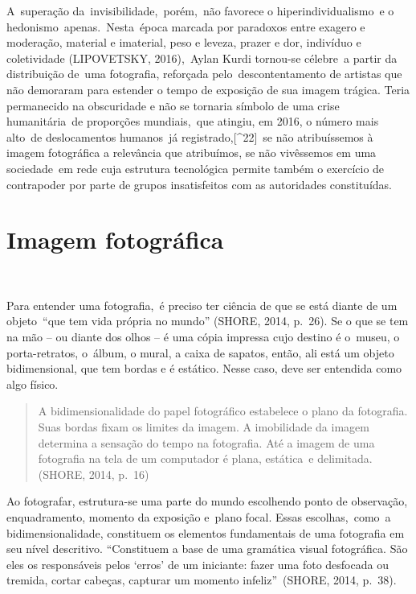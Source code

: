\documentclass[
  letterpaper,
]{scrbook}
\begin{document}
A~superação da~invisibilidade,~porém,~não favorece o
hiperindividualismo~e o hedonismo~apenas.~Nesta~época marcada por
paradoxos entre exagero e moderação, material e imaterial, peso e
leveza, prazer e dor, indivíduo e coletividade (LIPOVETSKY, 2016),~Aylan
Kurdi tornou-se célebre~a partir da distribuição de~uma fotografia,
reforçada pelo~descontentamento de artistas que não demoraram para
estender o tempo de exposição de sua imagem trágica. Teria permanecido
na obscuridade e não se tornaria símbolo de uma crise humanitária~de
proporções mundiais,~que atingiu, em 2016, o número mais alto~de
deslocamentos humanos~já registrado,{[}\^{}22{]}~se não atribuíssemos à
imagem fotográfica a relevância que atribuímos, se não vivêssemos em uma
sociedade~em rede cuja estrutura tecnológica permite também o exercício
de contrapoder por parte de grupos insatisfeitos com as autoridades
constituídas.~

\hypertarget{imagem-fotogruxe1fica}{%
\section{Imagem fotográfica~}\label{imagem-fotogruxe1fica}}

~

Para entender uma fotografia,~é preciso ter ciência de que se está
diante de um objeto~``que tem vida própria no mundo'' (SHORE, 2014,
p.~26). Se o que se tem na mão -- ou diante dos olhos -- é uma cópia
impressa cujo destino é o~museu, o porta-retratos, o~álbum, o mural, a
caixa de sapatos, então, ali está um objeto bidimensional, que tem
bordas e é estático. Nesse caso, deve ser entendida como algo físico.~ ~

\begin{quote}
A bidimensionalidade do papel fotográfico estabelece o plano da
fotografia. Suas bordas fixam os limites da imagem. A imobilidade da
imagem determina a sensação do tempo na fotografia. Até a imagem de uma
fotografia na tela de um computador é plana, estática~e delimitada.
(SHORE, 2014, p.~16) ~
\end{quote}

Ao fotografar, estrutura-se uma parte do mundo escolhendo ponto de
observação, enquadramento, momento da exposição e~plano focal. Essas
escolhas,~como~a bidimensionalidade, constituem os elementos
fundamentais de uma fotografia em seu nível descritivo. ``Constituem a
base de uma gramática visual fotográfica. São eles os responsáveis pelos
`erros' de um iniciante: fazer uma foto desfocada ou tremida, cortar
cabeças, capturar um momento infeliz''~(SHORE, 2014, p.~38).
\end{document}
